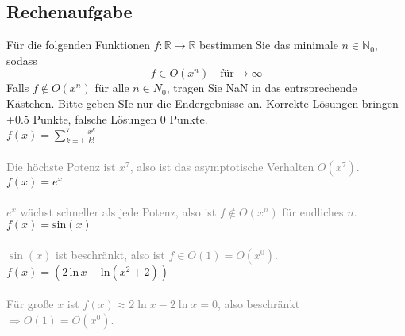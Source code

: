 \documentclass[a4paper]{article}
\begin{document}
\subsection{Rechenaufgabe}
Für die folgenden Funktionen $f: \mathbb{R} \rightarrow \mathbb{R}$ bestimmen Sie das minimale $n \in \mathbb{N}_0$, sodass
\[f \in O\left(x^n\right) \quad \text{für} \rightarrow \infty\]
Falls $f \notin O\left(x^n\right)$ für alle $n \in N_0$, tragen Sie NaN in das entrsprechende Kästchen. Bitte geben SIe nur die Endergebnisse an. Korrekte Lösungen bringen +0.5 Punkte, falsche Lösungen 0 Punkte.\\
\(f(x) = \sum\limits^7_{k=1} \frac{x^k}{k!}\)\\\\
\fbox{\parbox{\linewidth}{
\[f \in O(x^n) \quad \text{für} \, n = 7\]
}}\vspace*{2mm}
\textcolor{gray}{Die höchste Potenz ist $x^7$, also ist das asymptotische Verhalten $O(x^7)$.}\\

\(f(x) = e^x\)\\\\
\fbox{\parbox{\linewidth}{
\[f \in O(x^n) \quad \text{für} \, n = \text{NaN}\]
}}\vspace*{2mm}
\textcolor{gray}{$e^x$ wächst schneller als jede Potenz, also ist $f \notin O(x^n)$ für endliches $n$.}\\

\(f(x) = \text{sin}(x)\)\\\\
\fbox{\parbox{\linewidth}{
\[f \in O(x^n) \quad \text{für} \, n = 0\]
}}\vspace*{2mm}
\textcolor{gray}{$\sin(x)$ ist beschränkt, also ist $f \in O(1) = O(x^0)$.}\\

\(f(x) = (2 \, \text{ln} \, x - \text{ln}(x^2 + 2))\)\\\\
\fbox{\parbox{\linewidth}{
\[f \in O(x^n) \quad \text{für} \, n = 0\]
}}\vspace*{2mm}
\textcolor{gray}{Für große $x$ ist $f(x) \approx 2\ln x - 2\ln x = 0$, also beschränkt $\Rightarrow O(1) = O(x^0)$.}
\clearpage
\end{document}
